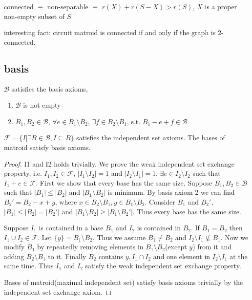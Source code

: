 \documentclass[12pt]{article}
\begin{document}
connected $\equiv$ non-separable $\equiv$ $r(X)+r(S-X)> r(S)$, $X$ is a proper non-empty subset of $S$. 

interesting fact: circuit matroid is connected if and only if the graph is 2-connected.


\subsection{basis}
\begin{theorem}
    $\mathcal B$ satisfies the basis axioms,
    \begin{enumerate}
        \item $\mathcal B$ is not empty
        \item $B_1,B_2\in \mathcal B$, $\forall e\in B_1\setminus B_2$, $\exists f\in B_2\setminus B_1$, s.t. $B_1-e+f\in \mathcal B$
    \end{enumerate}

    $\mathcal F=\{I|\exists B\in \mathcal B, I\subseteq B\}$ satisfies the independent set axioms. The bases of matroid satisfy basis axioms.
\end{theorem}
\begin{proof}
    I1 and I2 holds trivially. We prove the weak independent set exchange property, i.e. $I_1,I_2\in \mathcal F$, $|I_1\setminus I_2|=1$ and $|I_2\setminus I_1|=1$, $\exists e\in I_2\setminus I_2$ such that $I_1+e\in \mathcal F$. 
    First we show that every base has the same size.
    Suppose $B_1,B_2\in \mathcal{B}$ such that $|B_1|\leq |B_2|$ and $|B_1\setminus B_2|$ is minimum. By basis axiom 2 we can find $B_2'=B_2-x+y$, where $x\in B_2\setminus B_1,y\in B_1\setminus B_2$. Consider $B_1$ and $B_2'$, $|B_1|\leq |B_2|=|B_2'|$ and $|B_1\setminus B_2|\geq |B_1\setminus B_2'|$. Thus every base has the same size.
    
    Suppose $I_1$ is contained in a base $B_1$ and $I_2$ is contained in $B_2$. If $B_1=B_2$ then $I_1\cup I_2\in \mathcal F$. Let $\{y\}=B_1\setminus B_2$.
    Thus we assume $B_1\not=B_2$ and $I_2\setminus I_1\not\subseteq B_1$. Now we modify $B_1$ by repeatedly removing elements in $B_1\setminus B_2$(except $y$) from it and adding $B_2\setminus B_1$ to it. Finally $B_2$ contains $y,I_1\cap I_2$ and one element in $I_2\setminus I_1$ at the same time. Thus $I_1$ and $I_2$ satisfy the weak independent set exchange property.

    Bases of matroid(maximal independent set) satisfy basis axioms trivially by the independent set exchange axiom.
\end{proof}
\end{document}
